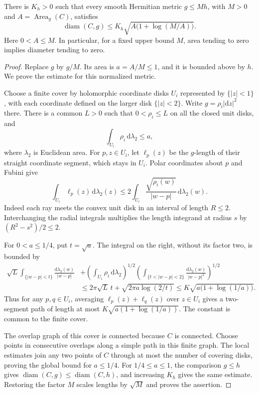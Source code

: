 \begin{lemma}\label{lem:conformal-area-diameter}
There is $K_h>0$ such that every smooth Hermitian metric $g\leq M h$, with $M>0$ and $A=\operatorname{Area}_g(C)$, satisfies
\[
 \operatorname{diam}(C,g)
 \leq K_h\sqrt{A\bigl(1+\log(M/A)\bigr)}.
\]
Here $0<A\leq M$. In particular, for a fixed upper bound $M$, area tending to zero implies diameter tending to zero.
\end{lemma}
\begin{proof}
Replace $g$ by $g/M$. Its area is $a=A/M\leq1$, and it is bounded above by $h$. We prove the estimate for this normalized metric.

Choose a finite cover by holomorphic coordinate disks $U_i$ represented by $\{|z|<1\}$, with each coordinate defined on the larger disk $\{|z|<2\}$. Write $g=\rho_i|\mathrm{d}z|^2$ there. There is a common $L>0$ such that $0<\rho_i\leq L$ on all the closed unit disks, and
\[
 \int_{U_i}\rho_i\,\mathrm{d}\lambda_2\leq a,
\]
where $\lambda_2$ is Euclidean area. For $p,z\in U_i$, let $\ell_p(z)$ be the $g$-length of their straight coordinate segment, which stays in $U_i$. Polar coordinates about $p$ and Fubini give
\[
 \int_{U_i}\ell_p(z)\,\mathrm{d}\lambda_2(z)
 \leq 2\int_{U_i}\frac{\sqrt{\rho_i(w)}}{|w-p|}
                    \,\mathrm{d}\lambda_2(w).
\]
Indeed each ray meets the convex unit disk in an interval of length $R\leq2$. Interchanging the radial integrals multiplies the length integrand at radius $s$ by $(R^2-s^2)/2\leq2$.

For $0<a\leq1/4$, put $t=\sqrt a$. The integral on the right, without its factor two, is bounded by
\[
 \begin{split}
 \sqrt L\int_{\{|w-p|<t\}}\frac{\mathrm{d}\lambda_2(w)}{|w-p|}
 &+\left(\int_{U_i}\rho_i\,\mathrm{d}\lambda_2\right)^{1/2}
   \left(\int_{\{t<|w-p|<2\}}\frac{\mathrm{d}\lambda_2(w)}{|w-p|^2}\right)^{1/2}\\
 &\leq 2\pi\sqrt L\,t+\sqrt{2\pi a\log(2/t)}
 \leq K\sqrt{a\bigl(1+\log(1/a)\bigr)}.
 \end{split}
\]
Thus for any $p,q\in U_i$, averaging $\ell_p(z)+\ell_q(z)$ over $z\in U_i$ gives a two-segment path of length at most $K\sqrt{a(1+\log(1/a))}$. The constant is common to the finite cover.

The overlap graph of this cover is connected because $C$ is connected. Choose points in consecutive overlaps along a simple path in this finite graph. The local estimates join any two points of $C$ through at most the number of covering disks, proving the global bound for $a\leq1/4$. For $1/4\leq a\leq1$, the comparison $g\leq h$ gives $\operatorname{diam}(C,g)\leq\operatorname{diam}(C,h)$, and increasing $K_h$ gives the same estimate. Restoring the factor $M$ scales lengths by $\sqrt M$ and proves the assertion.
\end{proof}

